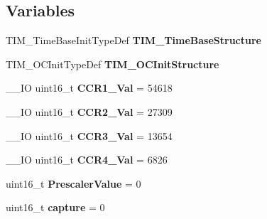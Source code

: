 \subsection*{Variables}
\begin{DoxyCompactItemize}
\item 
\hypertarget{group___t_i_m___time_base_gad2b9d014ac15d04c276608d776531753}{T\-I\-M\-\_\-\-Time\-Base\-Init\-Type\-Def {\bfseries T\-I\-M\-\_\-\-Time\-Base\-Structure}}\label{group___t_i_m___time_base_gad2b9d014ac15d04c276608d776531753}

\item 
\hypertarget{group___t_i_m___time_base_gac4d1bcad2e781ea94976c53a092163eb}{T\-I\-M\-\_\-\-O\-C\-Init\-Type\-Def {\bfseries T\-I\-M\-\_\-\-O\-C\-Init\-Structure}}\label{group___t_i_m___time_base_gac4d1bcad2e781ea94976c53a092163eb}

\item 
\hypertarget{group___t_i_m___time_base_ga7cbab8842c568ac280e0943dde582045}{\-\_\-\-\_\-\-I\-O uint16\-\_\-t {\bfseries C\-C\-R1\-\_\-\-Val} = 54618}\label{group___t_i_m___time_base_ga7cbab8842c568ac280e0943dde582045}

\item 
\hypertarget{group___t_i_m___time_base_ga6b56238dd523d422ad8a32525e333e1d}{\-\_\-\-\_\-\-I\-O uint16\-\_\-t {\bfseries C\-C\-R2\-\_\-\-Val} = 27309}\label{group___t_i_m___time_base_ga6b56238dd523d422ad8a32525e333e1d}

\item 
\hypertarget{group___t_i_m___time_base_ga48d274c049611e67f16e99a0fe050003}{\-\_\-\-\_\-\-I\-O uint16\-\_\-t {\bfseries C\-C\-R3\-\_\-\-Val} = 13654}\label{group___t_i_m___time_base_ga48d274c049611e67f16e99a0fe050003}

\item 
\hypertarget{group___t_i_m___time_base_gaa30e59abd3e408390ad1a6f516aa7c2d}{\-\_\-\-\_\-\-I\-O uint16\-\_\-t {\bfseries C\-C\-R4\-\_\-\-Val} = 6826}\label{group___t_i_m___time_base_gaa30e59abd3e408390ad1a6f516aa7c2d}

\item 
\hypertarget{group___t_i_m___time_base_ga926539c31db1b9beef91893c9e44fd20}{uint16\-\_\-t {\bfseries Prescaler\-Value} = 0}\label{group___t_i_m___time_base_ga926539c31db1b9beef91893c9e44fd20}

\item 
\hypertarget{group___t_i_m___time_base_gae343b5adc5ecb428da1c410d2b106ab2}{uint16\-\_\-t {\bfseries capture} = 0}\label{group___t_i_m___time_base_gae343b5adc5ecb428da1c410d2b106ab2}


\end{DoxyCompactItemize}
